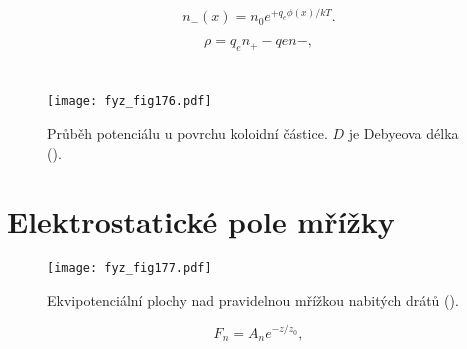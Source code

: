   \begin{equation*}
    n_−(x)=n_0e^{+q_eϕ(x)/kT}.
  \end{equation*}

  \begin{equation*}
    ρ=q_en_+ −qen−,
  \end{equation*}

  \begin{equation}\label{fyz:eq853}
    
  \end{equation}

  \begin{equation}\label{fyz:eq854}
    
  \end{equation}


  \begin{figure}[ht!]  %
    \centering
    \texttt{[image: fyz\_fig176.pdf]}
    \caption{Průběh potenciálu u povrchu koloidní částice. \(D\) je Debyeova délka
             (\cite[s.~134]{Feynman02}).}
    \label{fyz:fig176}
  \end{figure}
  
\section{Elektrostatické pole mřížky}\label{fyz:IIchapVsecXXVI}

  \begin{figure}[ht!]  %
    \centering
    \texttt{[image: fyz\_fig177.pdf]}
    \caption{Ekvipotenciální plochy nad pravidelnou mřížkou nabitých drátů
             (\cite[s.~136]{Feynman02}).}
    \label{fyz:fig177}
  \end{figure}

  \begin{equation}\label{fyz:eq800} 
    F_n=A_ne^{−z/z_0},
  \end{equation}

